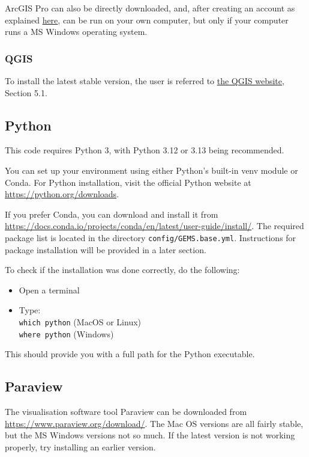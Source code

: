 ArcGIS Pro can also be directly downloaded, and, after creating an account as explained \href{https://durhamuni.maps.arcgis.com/home/index.html}{here}, can be run on your own computer, but only if your computer runs a MS Windows operating system.

\subsubsection{QGIS}
To install the latest stable version, the user is referred to \href{https://docs.qgis.org/3.34/en/docs/user_manual}{the QGIS website}, Section 5.1.

\subsection{Python}
This code requires Python 3, with Python 3.12 or 3.13 being recommended. 

You can set up your environment using either Python's built-in venv module or Conda. For Python installation, visit the official Python website at \url{https://python.org/downloads}. 

If you prefer Conda, you can download and install it from \url{https://docs.conda.io/projects/conda/en/latest/user-guide/install/}. The required package list is located in the directory \texttt{config/GEMS.base.yml}. Instructions for package installation will be provided in a later section. 

To check if the installation was done correctly, do the following:
\begin{itemize}
    \item Open a terminal 
    \item Type: \\
    {\tt which python} (MacOS or Linux)\\
    {\tt where python} (Windows)
\end{itemize}
This should provide you with a full path for the Python executable. 


\subsection{Paraview}
The visualisation software tool Paraview can be downloaded from \url{https://www.paraview.org/download/}. The Mac OS versions are all fairly stable, but the MS Windows versions not so much. If the latest version is not working properly, try installing an earlier version. 

